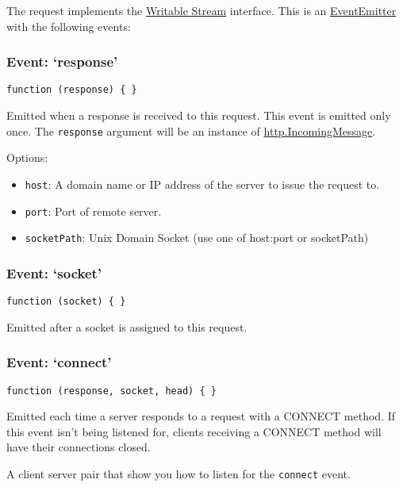 The request implements the
\href{stream.html\#stream_writable_stream}{Writable Stream} interface.
This is an
\href{events.html\#events_class_events_eventemitter}{EventEmitter} with
the following events:

\subsubsection{Event: `response'}\label{event-response}

\texttt{function (response) \{ \}}

Emitted when a response is received to this request. This event is
emitted only once. The \texttt{response} argument will be an instance of
\hyperref[httpux5fhttpux5fincomingmessage]{http.IncomingMessage}.

Options:

\begin{itemize}
\itemsep1pt\parskip0pt
\item
  \texttt{host}: A domain name or IP address of the server to issue the
  request to.
\item
  \texttt{port}: Port of remote server.
\item
  \texttt{socketPath}: Unix Domain Socket (use one of host:port or
  socketPath)
\end{itemize}

\subsubsection{Event: `socket'}\label{event-socket}

\texttt{function (socket) \{ \}}

Emitted after a socket is assigned to this request.

\subsubsection{Event: `connect'}\label{event-connect-1}

\texttt{function (response, socket, head) \{ \}}

Emitted each time a server responds to a request with a CONNECT method.
If this event isn't being listened for, clients receiving a CONNECT
method will have their connections closed.

A client server pair that show you how to listen for the
\texttt{connect} event.

